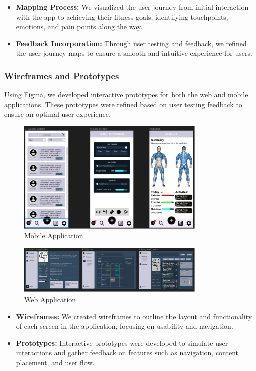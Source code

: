 \begin{itemize}
  \item \textbf{Mapping Process:} We visualized the user journey from initial interaction with the app to achieving their fitness goals, identifying touchpoints, emotions, and pain points along the way.
  
  \item \textbf{Feedback Incorporation:} Through user testing and feedback, we refined the user journey maps to ensure a smooth and intuitive experience for users.
\end{itemize}

\subsubsection{Wireframes and Prototypes}
Using Figma, we developed interactive prototypes for both the web and mobile applications. These prototypes were refined based on user testing feedback to ensure an optimal user experience.

\begin{figure}[H]
    \centering
    \includegraphics[width=0.8\textwidth]{images/figma.png}
    \caption{Mobile Application}
    \label{fig:figma}
  \end{figure}

  \begin{figure}[H]
    \centering
    \includegraphics[width=0.8\textwidth]{images/figma2.png}
    \caption{Web Application}
    \label{fig:figma2}
  \end{figure}


\begin{itemize}
  \item \textbf{Wireframes:} We created wireframes to outline the layout and functionality of each screen in the application, focusing on usability and navigation.
  
  \item \textbf{Prototypes:} Interactive prototypes were developed to simulate user interactions and gather feedback on features such as navigation, content placement, and user flow.
\end{itemize}

